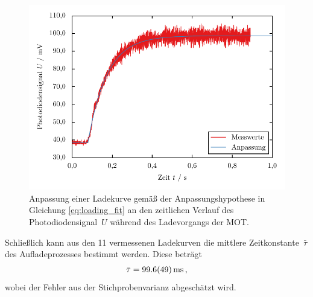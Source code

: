 \documentclass[11pt, a4paper]{article}
\numberwithin{equation}{section}
\begin{document}
\begin{figure}[htbp]
	\centering
	\includegraphics{./figures/loading/loading11.pdf}
	\caption{Anpassung einer Ladekurve gemäß der Anpassungshypothese in Gleichung \eqref{eq:loading_fit} an den zeitlichen Verlauf des Photodiodensignal~$U$ während des Ladevorgangs der MOT.}
	\label{fig:loading}
	
	\vspace{1cm}
	
	\resizebox{\textwidth}{!}{
		
	}
	\label{tab:loading_params}
\end{figure}

Schließlich kann aus den 11 vermessenen Ladekurven die mittlere Zeitkonstante~$\bar{\tau}$ des Aufladeprozesses bestimmt werden.
Diese beträgt
\begin{align*}
	\bar{\tau} = \SI{99.6 +- 4.9}{ms} \, \text{,}
\end{align*}
wobei der Fehler aus der Stichprobenvarianz abgeschätzt wird.
\end{document}
